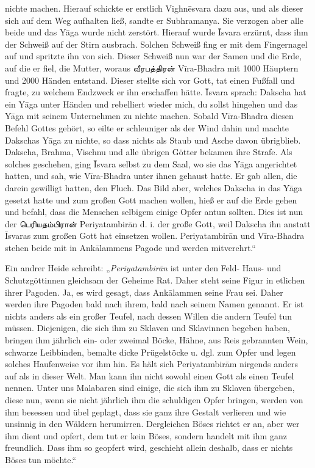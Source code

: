 \documentclass{article}
\newcommand{\TamilText}[1]{\texttamil{#1}}
\newcommand{\tam}[1]{\TamilText{#1}}
\begin{document}
nichte machen. Hierauf schickte er erstlich Vighn\={e}svara dazu aus, und als dieser sich auf dem Weg aufhalten ließ, sandte er Subhramanya. Sie verzogen aber alle beide und das Y\={a}ga wurde nicht zerstört. Hierauf wurde \={I}svara erzürnt, dass ihm der Schweiß auf der Stirn ausbrach. Solchen Schweiß fing er mit dem Fingernagel auf und spritzte ihn von sich. Dieser Schweiß nun war der Samen und die Erde, auf die er fiel, die Mutter, woraus \tam{வீரபத்திரன்} V\={i}ra-Bhadra mit 1000 Häuptern und 2000 Händen entstand. Dieser stellte sich vor Gott, tat einen Fußfall und fragte, zu welchem Endzweck er ihn erschaffen hätte. \={I}svara sprach: Dakscha hat ein Y\={a}ga unter Händen und rebelliert wieder mich, du sollst hingehen und das Y\={a}ga mit seinem Unternehmen zu nichte machen. Sobald V\={i}ra-Bhadra diesen Befehl Gottes gehört, so eilte er schleuniger als der Wind dahin und machte Dakschas Y\={a}ga zu nichte, so dass nichts als Staub und Asche davon übrigblieb. Dakscha, Brahma, Vischnu und alle übrigen Götter bekamen ihre Strafe. Als solches geschehen, ging \={I}svara selbst zu dem Saal, wo sie das Y\={a}ga angerichtet hatten, und sah, wie V\={i}ra-Bhadra unter ihnen gehaust hatte. Er gab allen, die darein gewilligt hatten, den Fluch. Das Bild aber, welches Dakscha in das Y\={a}ga gesetzt hatte und zum großen Gott machen wollen, hieß er auf die Erde gehen und befahl, dass die Menschen selbigem einige Opfer antun sollten. Dies ist nun der \tam{பெரியதம்பிரான்} Periyatambir\={a}n d. i. der große Gott, weil Dakscha ihn anstatt \={I}svaras zum großen Gott hat einsetzen wollen. Periyatambir\={a}n und V\={i}ra-Bhadra stehen beide mit in Ank\={a}lammens Pagode und werden mitverehrt.“

Ein andrer Heide schreibt: „\emph{Periyatambir\={a}n} ist unter den Feld- Haus- und Schutzgöttinnen gleichsam der Geheime Rat. Daher steht seine Figur in etlichen ihrer Pagoden. Ja, es wird gesagt, dass Ank\={a}lammen seine Frau sei. Daher werden ihre Pagoden bald nach ihrem, bald nach seinem Namen genannt. Er ist nichts anders als ein großer Teufel, nach dessen Willen die andern Teufel tun müssen. Diejenigen, die sich ihm zu Sklaven und Sklavinnen begeben haben, bringen ihm jährlich ein- oder zweimal Böcke, Hähne, aus Reis gebrannten Wein, schwarze Leibbinden, bemalte dicke Prügelstöcke u. dgl. zum Opfer und legen solches Haufenweise vor ihm hin. Es hält sich Periyatambir\={a}m nirgends anders auf als in dieser Welt. Man kann ihn nicht sowohl einen Gott als einen Teufel nennen. Unter uns Malabaren sind einige, die sich ihm zu Sklaven übergeben, diese nun, wenn sie nicht jährlich ihm die schuldigen Opfer bringen, werden von ihm besessen und übel geplagt, dass sie ganz ihre Gestalt verlieren und wie unsinnig in den Wäldern herumirren. Dergleichen Böses richtet er an, aber wer ihm dient und opfert, dem tut er kein Böses, sondern handelt mit ihm ganz freundlich. Dass ihm so geopfert wird, geschieht allein deshalb, dass er nichts Böses tun möchte.“
\end{document}
